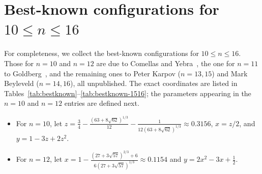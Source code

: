 \documentclass[11pt,a4paper]{article}
\theoremstyle{plain}
\theoremstyle{definition}
\theoremstyle{remark}
\begin{document}
\printbibliography

\appendix\label{appendix}

\section{Best-known configurations for $10\le n\le 16$}
\label{app:best-known}

For completeness, we collect the best-known configurations for $10\le n\le 16$.
Those for $n=10$ and $n=12$ are due to Comellas and Yebra~\cite{comellasyebra2002},
the one for $n=11$ to Goldberg~\cite{goldberg1972maximizing}, and the remaining
ones to Peter Karpov ($n=13,15$) and Mark Beyleveld ($n=14,16$), all unpublished.
The exact coordinates are listed in
Tables~\ref{tab:bestknown}--\ref{tab:bestknown-1516}; the parameters appearing in
the $n=10$ and $n=12$ entries are defined next.

\begin{itemize}
  \item For $n=10$, let $z = \frac{3}{4} - \frac{(63+8\sqrt{62})^{1/3}}{12} - \frac{1}{12(63+8\sqrt{62})^{1/3}} \approx 0.3156$,
$x = z/2$, and $y = 1-3z+2z^2$.
\item For $n=12$, let $x = 1 - \frac{(27+3\sqrt{57})^{2/3}+6}{6(27+3\sqrt{57})^{1/3}} \approx 0.1154$
and $y = 2x^2-3x+\frac{1}{2}$.
\end{itemize}
\end{document}
